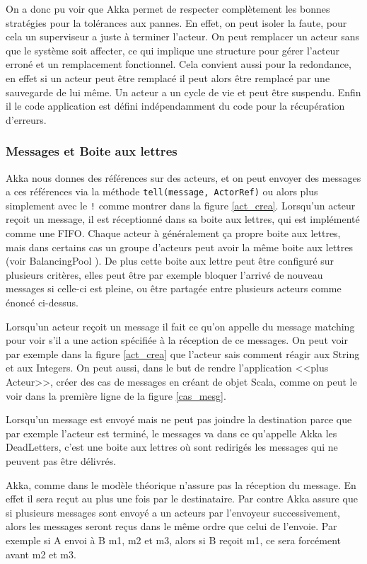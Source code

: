 \documentclass[12pt, a4paper]{article}
\begin{document}
\newline
\par 
On a donc pu voir que Akka permet de respecter complètement les bonnes stratégies pour la tolérances aux pannes. En effet, on peut isoler la faute, pour cela un superviseur a juste à terminer l'acteur. On peut remplacer un acteur sans que le système soit affecter, ce qui implique une structure pour gérer l'acteur erroné et un remplacement fonctionnel. Cela convient aussi pour la redondance, en effet si un acteur peut être remplacé il peut alors être remplacé par une sauvegarde de lui même. Un acteur a un cycle de vie et peut être suspendu. Enfin il le code application est défini indépendamment du code pour la récupération d'erreurs.
\subsubsection{Messages et Boite aux lettres}
Akka nous donnes des références sur des acteurs, et on peut envoyer des messages a ces références via la méthode \texttt{tell(message, ActorRef)} ou alors plus simplement avec le \texttt{!} comme montrer dans la figure \ref{act_crea}. Lorsqu'un acteur reçoit un message, il est réceptionné dans sa boite aux lettres, qui est implémenté comme une FIFO. Chaque acteur à généralement ça propre boite aux lettres, mais dans certains cas un groupe d'acteurs peut avoir la même boite aux lettres (voir BalancingPool \cite{akka}). De plus cette boite aux lettre peut être configuré sur plusieurs critères, elles peut être par exemple bloquer l'arrivé de nouveau messages si celle-ci est pleine, ou être partagée entre plusieurs acteurs comme énoncé ci-dessus.
\par Lorsqu'un acteur reçoit un message il fait ce qu'on appelle du message matching pour voir s'il a une action spécifiée à la réception de ce messages. On peut voir par exemple dans la figure \ref{act_crea} que l'acteur sais comment réagir aux String et aux Integers. On peut aussi, dans le but de rendre l'application <<plus Acteur>>, créer des cas de messages en créant de objet Scala, comme on peut le voir dans la première ligne de la figure \ref{cas_mesg}.
\par Lorsqu'un message est envoyé mais ne peut pas joindre la destination parce que par exemple l'acteur est terminé, le messages va dans ce qu'appelle Akka les DeadLetters, c'est une boite aux lettres où sont redirigés les messages qui ne peuvent pas être délivrés.
\par Akka, comme dans le modèle théorique n'assure pas la réception du message. En effet il sera reçut au plus une fois par le destinataire. Par contre Akka assure que si plusieurs messages sont envoyé a un acteurs par l'envoyeur successivement, alors les messages seront reçus dans le même ordre que celui de l'envoie. Par exemple si A envoi à B m1, m2 et m3, alors si B reçoit m1, ce sera forcément avant m2 et m3.
\newline
\end{document}

